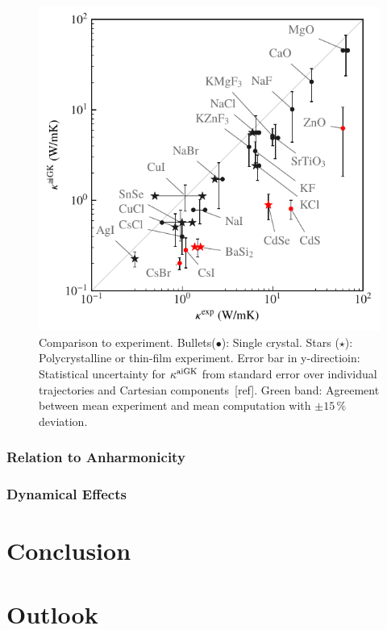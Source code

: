 \documentclass[nobib,a4paper,twoside,notoc,justified,marginals=justified]{tufte-book}
\begin{document}
\begin{figure}
	\includegraphics[width=\textwidth]{./plots/kappa_vs_exp/kappa_vs_exp.pdf}
	\caption{Comparison to experiment. Bullets($\bullet$): Single crystal. Stars ($\star$): Polycrystalline or thin-film experiment. Error bar in y-directioin: Statistical uncertainty for $\kappa^{\rm aiGK}$ from standard error over individual trajectories and Cartesian components~[ref]. Green band: Agreement between mean experiment and mean computation with $\pm 15\,\%$ deviation.}
	\label{fig:kappa_exp}
\end{figure}

\subsection{Relation to Anharmonicity}
\subsection{Dynamical Effects}


\chapter{Conclusion}

\chapter{Outlook}
\end{document}
